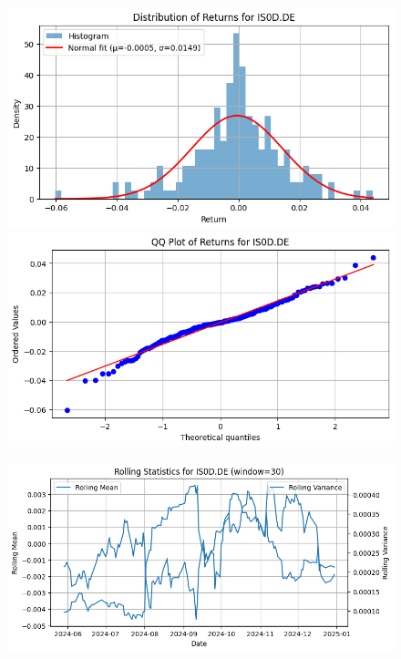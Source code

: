 \documentclass{article}%
\begin{document}
\begin{figure}[htbp]%
\begin{minipage}{0.49\textwidth}%
\includegraphics[width=\linewidth]{ticker_images/IS0D.DE_return_distribution.png}%
\end{minipage}%
\begin{minipage}{0.49\textwidth}%
\includegraphics[width=\linewidth]{ticker_images/IS0D.DE_qq_plot.png}%
\end{minipage}%
\end{figure}

%


\begin{figure}[htbp]%
\begin{minipage}{0.49\textwidth}%
\includegraphics[width=\linewidth]{ticker_images/IS0D.DE_rolling_stats.png}%
\end{minipage}%
\end{figure}

%
\newpage

%
\end{document}
